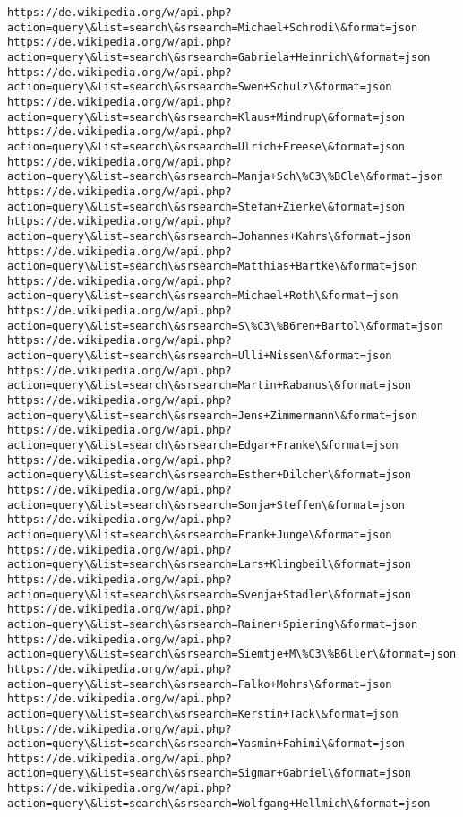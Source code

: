 \documentclass[11pt]{article}
\begin{document}
\begin{Verbatim}[commandchars=\\\{\}]
https://de.wikipedia.org/w/api.php?action=query\&list=search\&srsearch=Michael+Schrodi\&format=json
https://de.wikipedia.org/w/api.php?action=query\&list=search\&srsearch=Gabriela+Heinrich\&format=json
https://de.wikipedia.org/w/api.php?action=query\&list=search\&srsearch=Swen+Schulz\&format=json
https://de.wikipedia.org/w/api.php?action=query\&list=search\&srsearch=Klaus+Mindrup\&format=json
https://de.wikipedia.org/w/api.php?action=query\&list=search\&srsearch=Ulrich+Freese\&format=json
https://de.wikipedia.org/w/api.php?action=query\&list=search\&srsearch=Manja+Sch\%C3\%BCle\&format=json
https://de.wikipedia.org/w/api.php?action=query\&list=search\&srsearch=Stefan+Zierke\&format=json
https://de.wikipedia.org/w/api.php?action=query\&list=search\&srsearch=Johannes+Kahrs\&format=json
https://de.wikipedia.org/w/api.php?action=query\&list=search\&srsearch=Matthias+Bartke\&format=json
https://de.wikipedia.org/w/api.php?action=query\&list=search\&srsearch=Michael+Roth\&format=json
https://de.wikipedia.org/w/api.php?action=query\&list=search\&srsearch=S\%C3\%B6ren+Bartol\&format=json
https://de.wikipedia.org/w/api.php?action=query\&list=search\&srsearch=Ulli+Nissen\&format=json
https://de.wikipedia.org/w/api.php?action=query\&list=search\&srsearch=Martin+Rabanus\&format=json
https://de.wikipedia.org/w/api.php?action=query\&list=search\&srsearch=Jens+Zimmermann\&format=json
https://de.wikipedia.org/w/api.php?action=query\&list=search\&srsearch=Edgar+Franke\&format=json
https://de.wikipedia.org/w/api.php?action=query\&list=search\&srsearch=Esther+Dilcher\&format=json
https://de.wikipedia.org/w/api.php?action=query\&list=search\&srsearch=Sonja+Steffen\&format=json
https://de.wikipedia.org/w/api.php?action=query\&list=search\&srsearch=Frank+Junge\&format=json
https://de.wikipedia.org/w/api.php?action=query\&list=search\&srsearch=Lars+Klingbeil\&format=json
https://de.wikipedia.org/w/api.php?action=query\&list=search\&srsearch=Svenja+Stadler\&format=json
https://de.wikipedia.org/w/api.php?action=query\&list=search\&srsearch=Rainer+Spiering\&format=json
https://de.wikipedia.org/w/api.php?action=query\&list=search\&srsearch=Siemtje+M\%C3\%B6ller\&format=json
https://de.wikipedia.org/w/api.php?action=query\&list=search\&srsearch=Falko+Mohrs\&format=json
https://de.wikipedia.org/w/api.php?action=query\&list=search\&srsearch=Kerstin+Tack\&format=json
https://de.wikipedia.org/w/api.php?action=query\&list=search\&srsearch=Yasmin+Fahimi\&format=json
https://de.wikipedia.org/w/api.php?action=query\&list=search\&srsearch=Sigmar+Gabriel\&format=json
https://de.wikipedia.org/w/api.php?action=query\&list=search\&srsearch=Wolfgang+Hellmich\&format=json

\end{Verbatim}
\end{document}
